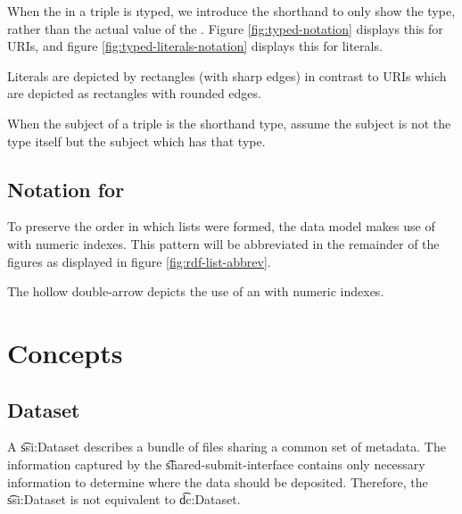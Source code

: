   When the  in a triple is \i{typed}, we introduce the shorthand
  to only show the type, rather than the actual value of the .
  Figure \ref{fig:typed-notation} displays this for URIs, and figure
  \ref{fig:typed-literals-notation} displays this for literals.


  Literals are depicted by rectangles (with sharp edges) in contrast to URIs
  which are depicted as rectangles with rounded edges.


  When the subject of a triple is the shorthand type, assume the subject is not
  the type itself but the subject which has that type.

\subsection{Notation for }

  To preserve the order in which lists were formed, the data model makes use
  of  with numeric indexes.  This pattern will be abbreviated
  in the remainder of the figures as displayed in figure
  \ref{fig:rdf-list-abbrev}.


  The hollow double-arrow depicts the use of an  with numeric
  indexes.

\section{Concepts}

\subsection{Dataset}

  A \t{ssi:Dataset} describes a bundle of files sharing a common set of
  metadata.  The information captured by the \t{shared-submit-interface}
  contains only necessary information to determine where the data should
  be deposited. Therefore, the \t{ssi:Dataset} is not equivalent to
  \t{dc:Dataset}.

